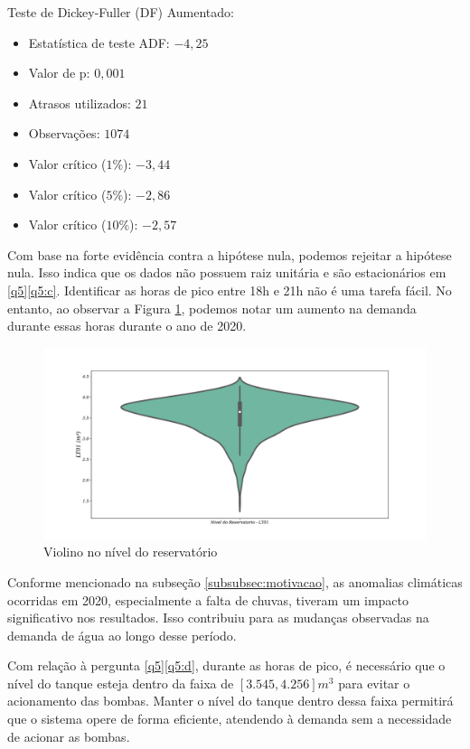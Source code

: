 Teste de Dickey-Fuller (DF) Aumentado:
\begin{itemize}
	\item Estatística de teste ADF: $-4,25$
	\item Valor de p: $0,001$
	\item Atrasos utilizados: $21$
	\item Observações: $1074$
	\item Valor crítico ($1\%$): $-3,44$
	\item Valor crítico ($5\%$): $-2,86$
	\item Valor crítico ($10\%$): $-2,57$
\end{itemize}

Com base na forte evidência contra a hipótese nula, podemos rejeitar a hipótese nula. Isso indica que os dados não possuem raiz unitária e são estacionários em \ref{q5}\ref{q5:c}. Identificar as horas de pico entre 18h e 21h não é uma tarefa fácil. No entanto, ao observar a Figura \ref{fig:hist}, podemos notar um aumento na demanda durante essas horas durante o ano de 2020.
	
	
	\begin{figure}[!htpb]
		\centering
		\caption{Violino no nível do reservatório}
		\label{fig:hist}
		\includegraphics[width=0.9\linewidth]{Resultados/Figuras/viol}
		
	\end{figure}
	
Conforme mencionado na subseção \ref{subsubsec:motivacao}, as anomalias climáticas ocorridas em 2020, especialmente a falta de chuvas, tiveram um impacto significativo nos resultados. Isso contribuiu para as mudanças observadas na demanda de água ao longo desse período.

Com relação à pergunta \ref{q5}\ref{q5:d}, durante as horas de pico, é necessário que o nível do tanque esteja dentro da faixa de $[3.545,4.256] m^3$ para evitar o acionamento das bombas. Manter o nível do tanque dentro dessa faixa permitirá que o sistema opere de forma eficiente, atendendo à demanda sem a necessidade de acionar as bombas.
	
